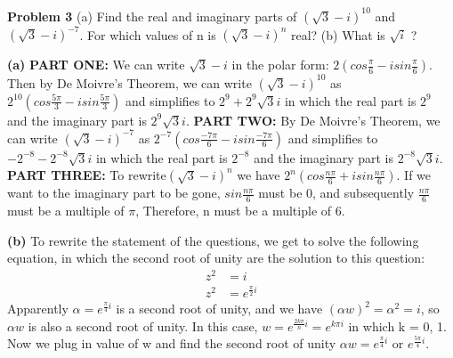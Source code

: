 \documentclass[12pt,letterpaper]{hmcpset}
\begin{document}
\begin{problem}\textbf{Problem 3}
\newline(a) Find the real and imaginary parts of $(\sqrt{3} - i)^{10}$ and $(\sqrt{3} - i)^{-7}$. For
  which values of n is $(\sqrt{3} - i)^{n}$ real? \newline (b) What is $\sqrt{i}$ ?
\end{problem}

\begin{solution}
\textbf{(a)}
\newline\newline \textbf{PART ONE:} We can write $\sqrt{3} - i$ in the polar form: $2(cos\frac{\pi}{6}-isin\frac{\pi}{6})$. Then by De Moivre's Theorem, we can write $(\sqrt{3} - i)^{10}$ as $2^{10}(cos\frac{5\pi}{3}-isin\frac{5\pi}{3})$ and simplifies to $2^{9}+2^{9}\sqrt{3}i$ in which the real part is $2^{9}$ and the imaginary part is $2^{9}\sqrt{3}i$.
\newline\newline \textbf{PART TWO:} By De Moivre's Theorem, we can write $(\sqrt{3} - i)^{-7}$ as $2^{-7}(cos\frac{-7\pi}{6}-isin\frac{-7\pi}{6})$ and simplifies to $-2^{-8}-2^{-8}\sqrt{3}i$ in which the real part is $2^{-8}$ and the imaginary part is $2^{-8}\sqrt{3}i$.
\newline\newline \textbf{PART THREE:} To rewrite$(\sqrt{3} - i)^{n}$ we have $2^{n}(cos\frac{n\pi}{6} + isin\frac{n\pi}{6})$. If we want to the imaginary part to be gone, $sin\frac{n\pi}{6}$ must be 0, and subsequently $\frac{n\pi}{6}$ must be a multiple of $\pi$, Therefore, n must be a multiple of 6. 
\end{solution}

\begin{solution}
\textbf{(b)} To rewrite the statement of the questions, we get to solve the following equation, in which the second root of unity are the solution to this question:
\begin{align*}
z^{2}	&= i		\\
z^{2}	&= e^{\frac{\pi}{2}i}
\end{align*}
Apparently $\alpha = e^{\frac{\pi}{4}i}$ is a second root of unity, and we have $(\alpha w)^{2} = \alpha ^{2} = i$, so $\alpha w$ is also a second root of unity. In this case, $w=e^{\frac{2k\pi}{n}i}=e^{k\pi i}$ in which k = 0, 1. Now we plug in value of w and find the second root of unity $\alpha w = e^{\frac{\pi}{4}i}$ or $e^{\frac{5\pi}{4}i}$.
\end{solution}
\end{document}
